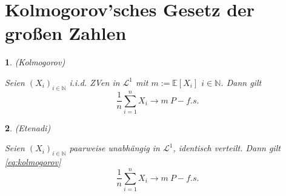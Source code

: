 \documentclass[10pt,a4paper]{report}
\numberwithin{equation}{section}
\numberwithin{figure}{section}
\theoremstyle{plain}
\theoremstyle{definition}
\theoremstyle{plain}
\newtheorem{prop}{\protect\propositionname}[section]
\theoremstyle{definition}
\theoremstyle{remark}
\theoremstyle{plain}
\theoremstyle{plain}
\theoremstyle{plain}
\theoremstyle{plain}
\theoremstyle{plain}
\providecommand{\propositionname}{Satz}
\newcommand{\1}{ \mathbb{1} } %
\begin{document}
\section{Kolmogorov'sches Gesetz der großen Zahlen}
\begin{prop}
(Kolmogorov)

Seien $\left(X_{i}\right)_{i\in\mathbb{N}}$ i.i.d. ZVen in $\mathcal{L}^{1}$
mit $m:=\mathbb{E}\left[X_{i}\right]$ $i\in\mathbb{N}$. Dann gilt
\begin{equation}
\frac{1}{n}\sum_{i=1}^{n}X_{i}\to m\ P-f.s.\label{eq:kolmogorov}
\end{equation}

\end{prop}

\begin{prop}
(Etenadi)

Seien $\left(X_{i}\right)_{i\in\mathbb{N}}$ \emph{paarweise }unabhängig
in $\mathcal{L}^{1}$, identisch verteilt. Dann gilt \ref{eq:kolmogorov}
\[
\frac{1}{n}\sum_{i=1}^{n}X_{i}\to m\ P-f.s.
\]
\end{prop}
\end{document}
